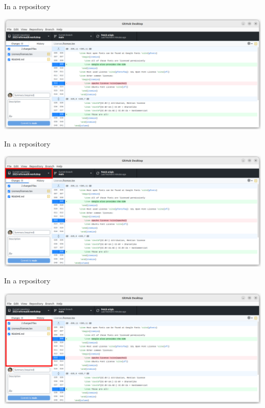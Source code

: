 \documentclass[compress,aspectratio=169]{beamer}
\begin{document}
  \begin{frame}{In a repository}
    \begin{center}
      \includegraphics[height=0.75\textheight]{./assets/GH_01.png}
    \end{center}
  \end{frame}
  \begin{frame}[noframenumbering]{In a repository}
    \begin{center}
      \includegraphics[height=0.75\textheight]{./assets/GH_01_01.png}
    \end{center}
  \end{frame}
  \begin{frame}[noframenumbering]{In a repository}
    \begin{center}
      \includegraphics[height=0.75\textheight]{./assets/GH_01_02.png}
    \end{center}
  \end{frame}
\end{document}
